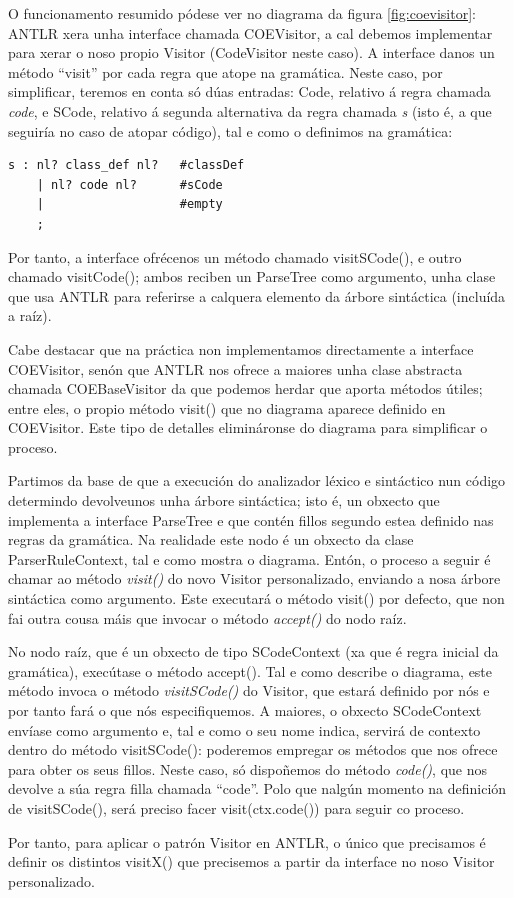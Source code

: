 \par
O funcionamento resumido pódese ver no diagrama da figura \ref{fig:coevisitor}:
ANTLR xera unha interface chamada COEVisitor, a cal debemos implementar para
xerar o noso propio Visitor (CodeVisitor neste caso). A interface danos un
método ``visit'' por cada regra que atope na gramática. Neste caso, por
simplificar, teremos en conta só dúas entradas: Code, relativo á regra chamada
\textit{code}, e SCode, relativo á segunda alternativa da regra chamada
\textit{s} (isto é, a que seguiría no caso de atopar código), tal e como o
definimos na gramática:
\begin{lstlisting}
s : nl? class_def nl?   #classDef
    | nl? code nl?      #sCode
    |                   #empty
    ;
\end{lstlisting}
Por tanto, a interface ofrécenos un método chamado visitSCode(), e outro chamado
visitCode(); ambos reciben un ParseTree como argumento, unha clase que usa ANTLR
para referirse a calquera elemento da árbore sintáctica (incluída a raíz).
\par
Cabe destacar que na práctica non implementamos directamente a interface
COEVisitor, senón que ANTLR nos ofrece a maiores unha clase abstracta chamada
COEBaseVisitor da que podemos herdar que aporta métodos útiles; entre eles, o
propio método visit() que no diagrama aparece definido en COEVisitor. Este tipo
de detalles elimináronse do diagrama para simplificar o proceso.
\par
Partimos da base de que a execución do analizador léxico e sintáctico
nun código determindo devolveunos unha árbore sintáctica; isto é, un obxecto que
implementa a interface ParseTree e que contén fillos segundo estea definido nas
regras da gramática. Na realidade este nodo é un obxecto da clase
ParserRuleContext, tal e como mostra o diagrama. Entón, o proceso a seguir é
chamar ao método \textit{visit()} do novo Visitor personalizado, enviando a nosa
árbore sintáctica como argumento. Este executará o método visit() por defecto,
que non fai outra cousa máis que invocar o método \textit{accept()} do nodo
raíz.
\par
No nodo raíz, que é un obxecto de tipo SCodeContext (xa que é regra inicial da
gramática), execútase o método accept(). Tal e como describe o diagrama, este
método invoca o método \textit{visitSCode()} do Visitor, que estará definido
por nós e por tanto fará o que nós especifiquemos. A maiores, o obxecto
SCodeContext envíase como argumento e, tal e como o seu nome indica, servirá de
contexto dentro do método visitSCode(): poderemos empregar os métodos que nos
ofrece para obter os seus fillos. Neste caso, só dispoñemos do método
\textit{code()}, que nos devolve a súa regra filla chamada ``code''. Polo que
nalgún momento na definición de visitSCode(), será preciso facer
visit(ctx.code()) para seguir co proceso.
\par
Por tanto, para aplicar o patrón Visitor en ANTLR, o único que precisamos é
definir os distintos visitX() que precisemos a partir da interface no noso
Visitor personalizado.

